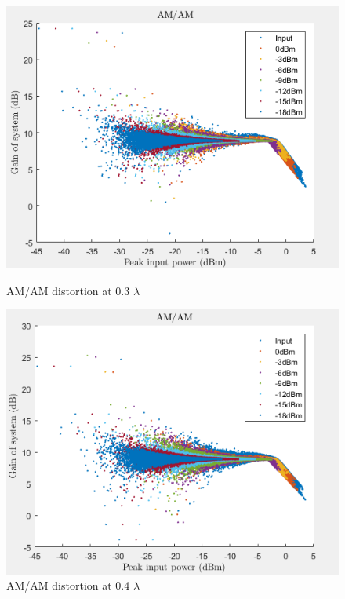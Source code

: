 \begin{figure}[H]
  \centering
  \begin{minipage}[b]{0.5\textwidth}
	\includegraphics[scale = 0.5]{figures/measurement/two_antenna/amam_03.png}
	\caption{AM/AM distortion at 0.3 $\lambda$}
    \label{fig:amam03}
  \end{minipage}
  \hfill
  \begin{minipage}[b]{0.4\textwidth}
\includegraphics[scale = 0.5]{figures/measurement/two_antenna/amam_04.png}
\caption{AM/AM distortion at 0.4 $\lambda$}
    \label{fig:amam04}
  \end{minipage}
\end{figure}

